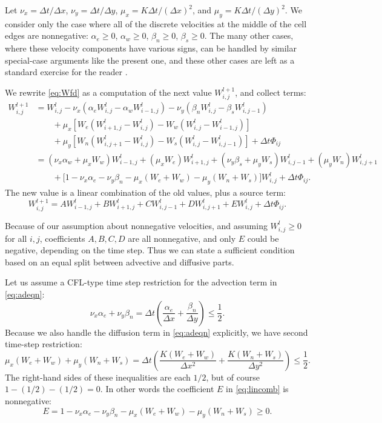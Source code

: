 \documentclass[11pt,final]{amsart}%
\newcommand{\Wlij}{W^l_{i,j}}
\begin{document}
Let $\nu_x = \Delta t/\Delta x$, $\nu_y = \Delta t/\Delta y$, $\mu_x = K \Delta t / (\Delta x)^2$, and $\mu_y = K \Delta t / (\Delta y)^2$.  We consider only the case where all of the discrete velocities at the middle of the cell edges are nonnegative: $\alpha_e\ge 0$, $\alpha_w\ge 0$, $\beta_n\ge 0$, $\beta_s\ge 0$.  The many other cases, where these velocity components have various signs, can be handled by similar special-case arguments like the present one, and these other cases are left as a standard exercise for the reader \citep{MortonMayers}.

We rewrite \eqref{eq:Wfd} as a computation of the next value $W_{i,j}^{l+1}$, and collect terms:
\begin{align*}
 W_{i,j}^{l+1} &= \Wlij - \nu_x \left(\alpha_e \Wlij - \alpha_w W_{i-1,j}^l\right) - \nu_y \left(\beta_n \Wlij - \beta_s W_{i,j-1}^l\right)  \\
      &\qquad + \mu_x \left[W_e \left(W_{i+1,j}^l - \Wlij\right) - W_w \left(\Wlij - W_{i-1,j}^l\right)\right]  \\
      &\qquad + \mu_y \left[W_n \left(W_{i,j+1}^l - \Wlij\right) - W_s \left(\Wlij - W_{i,j-1}^l\right)\right] + \Delta t \Phi_{ij} \\
      &= (\nu_x \alpha_w + \mu_x W_w) W_{i-1,j}^l + (\mu_x W_e) W_{i+1,j}^l + (\nu_y \beta_s + \mu_y W_s) W_{i,j-1}^l + (\mu_y W_n) W_{i,j+1}^l \\
      &\qquad + \Big[1 - \nu_x \alpha_e - \nu_y \beta_n - \mu_x (W_e + W_w) - \mu_y (W_n + W_s)\Big] \Wlij + \Delta t \Phi_{ij}.
\end{align*}
The new value is a linear combination of the old values, plus a source term:
\begin{equation}
W_{i,j}^{l+1} = A W_{i-1,j}^l + B W_{i+1,j}^l + C W_{i,j-1}^l + D W_{i,j+1}^l + E \Wlij + \Delta t \Phi_{ij}. \label{eq:lincomb}
\end{equation}

Because of our assumption about nonnegative velocities, and assuming $\Wlij \ge 0$ for all $i,j$, coefficients $A,B,C,D$ are all nonnegative, and only $E$ could be negative, depending on the time step.  Thus we can state a sufficient condition based on an equal split between advective and diffusive parts.

Let us assume a CFL-type time step restriction for the advection term in  \eqref{eq:adeqn}:
\begin{equation}
\nu_x \alpha_e + \nu_y \beta_n = \Delta t \left(\frac{\alpha_e}{\Delta x} + \frac{\beta_n}{\Delta y}\right) \le \frac{1}{2}. \label{eq:adstabcond}
\end{equation}
Because we also handle the diffusion term in \eqref{eq:adeqn} explicitly, we have second time-step restriction:
\begin{equation}
\mu_x (W_e + W_w) + \mu_y (W_n + W_s) = \Delta t \left(\frac{K(W_e + W_w)}{\Delta x^2} + \frac{K(W_n + W_s)}{\Delta y^2}\right) \le \frac{1}{2}. \label{eq:diffstabcond}
\end{equation}
The right-hand sides of these inequalities are each $1/2$, but of course $1-(1/2)-(1/2)=0$.  In other words the coefficient $E$ in \eqref{eq:lincomb} is nonnegative:
	$$E = 1 - \nu_x \alpha_e - \nu_y \beta_n - \mu_x (W_e + W_w) - \mu_y (W_n + W_s) \ge 0.$$
\end{document}
